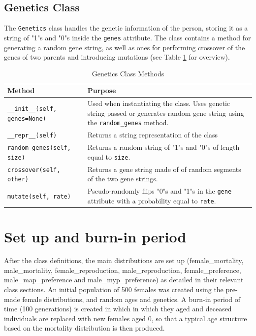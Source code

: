 \documentclass[authoryearcitations]{UoYCSproject}
\begin{document}
\newpage
\subsection{Genetics Class}
The \texttt{Genetics} class handles the genetic information of the person, storing it as a string of "1"s and "0"s inside the \texttt{genes} attribute. The class contains a method for generating a random gene string, as well as ones for performing crossover of the genes of two parents and introducing mutations (see Table \ref{tbl:geneticsMethods} for overview).

\begin{table}[h]
\caption{Genetics Class Methods}
\label{tbl:geneticsMethods}
\begin{tabular}{m{} m{}}
\textbf{Method} & \textbf{Purpose} \\\hline
\texttt{\_\_init\_\_(self, genes=None)} & Used when instantiating the class. Uses genetic string passed or generates random gene string using the \texttt{random\_genes} method.\\\hline
\texttt{\_\_repr\_\_(self)} & Returns a string representation of the class \\\hline
\texttt{random\_genes(self, size)} & Returns a random string of "1"s and "0"s of length equal to \texttt{size}. \\\hline
\texttt{crossover(self, other)} & Returns a gene string made of of random segments of the two gene strings. \\\hline
\texttt{mutate(self, rate)} & Pseudo-randomly flips "0"s and "1"s in the \texttt{gene} attribute with a probability equal to \texttt{rate}.
\end{tabular}
\end{table}

\section{Set up and burn-in period}
After the class definitions, the main distributions are set up (female\_mortality, male\_mortality, female\_reproduction, male\_reproduction, female\_preference, male\_map\_preference and male\_myp\_preference) as detailed in their relevant class sections. An initial population of 500 females was created using the pre-made female distributions, and random ages and genetics. A burn-in period of time (100 generations) is created in which in which they aged and deceased individuals are replaced with new females aged 0, so that a typical age structure based on the mortality distribution is then produced. 
\end{document}
